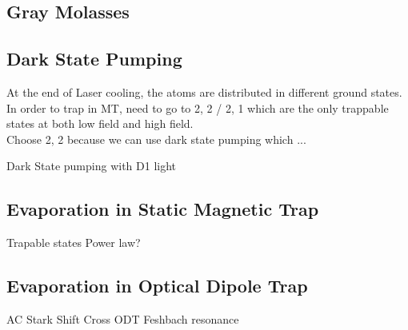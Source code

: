 \subsection{Gray Molasses}\label{theory:gm}

\subsection{Dark State Pumping}\label{theory:pump}
At the end of Laser cooling, the atoms are distributed in different ground states.\\
In order to trap in MT, need to go to 2, 2 / 2, 1 which are the only trappable states at both low field and high field.\\
Choose 2, 2 because we can use dark state pumping which ...

Dark State pumping with D1 light

\subsection{Evaporation in Static Magnetic Trap}\label{theory:mt}
Trapable states
Power law?

\subsection{Evaporation in Optical Dipole Trap}\label{theory:odt}
AC Stark Shift
Cross ODT
Feshbach resonance

